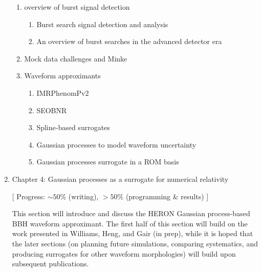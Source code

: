 \documentclass{kentigern}
\theoremstyle{definition}
\begin{document}
\begin{enumerate}
\begin{enumerate}
  \item overview of burst signal detection
    \begin{enumerate}
    \item Burst search signal detection and analysis
    \item An overview of burst searches in the advanced detector era
    \end{enumerate}
    
  \item Mock data challenges and Minke
  \item Waveform approximants
    \begin{enumerate}
    \item IMRPhenomPv2   
    \item SEOBNR
    \item Spline-based surrogates
    \item Gaussian processes to model waveform uncertainty
    \item Gaussian processes surrogate in a ROM basis
    \end{enumerate}
  \end{enumerate}
\item Chapter 4: Gaussian processes as a surrogate for numerical relativity
  
  [ Progress: $\sim 50\%$ (writing), $>50\%$  (programming \& results) ]

  This
    section will introduce and discuss the HERON Gaussian
    process-based BBH waveform approximant. The first half of this
    section will build on the work presented in Williams, Heng, and
    Gair (in prep), while it is hoped that the later sections (on
    planning future simulations, comparing systematics, and producing
    surrogates for other waveform morphologies) will build upon
    subsequent publications.

    \begin{enumerate}
    

\end{enumerate}
\end{enumerate}
\end{document}
